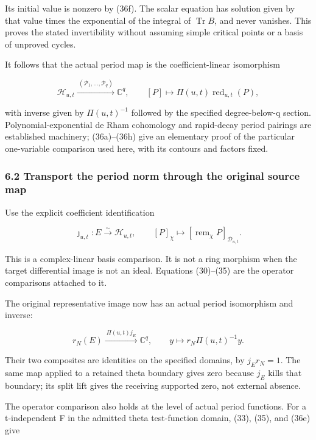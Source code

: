 \documentclass[
  11pt,
]{article}
\begin{document}
Its initial value is nonzero by (36f). The scalar equation has solution
given by that value times the exponential of the integral of
\(\operatorname{Tr}B\), and never vanishes. This proves the stated
invertibility without assuming simple critical points or a basis of
unproved cycles.

It follows that the actual period map is the coefficient-linear
isomorphism

\[
\boxed{\mathcal H_{u,t}\xrightarrow{\ (\mathcal P_1,\ldots,\mathcal P_q)\ }\mathbb C^q,
\qquad [P]\longmapsto\Pi(u,t)\operatorname{red}_{u,t}(P),}
\tag{36h}
\]

with inverse given by \(\Pi(u,t)^{-1}\) followed by the specified
degree-below-q section. Polynomial-exponential de Rham cohomology and
rapid-decay period pairings are established machinery; (36a)--(36h) give
an elementary proof of the particular one-variable comparison used here,
with its contours and factors fixed.

\subsubsection{6.2 Transport the period norm through the original source
map}\label{transport-the-period-norm-through-the-original-source-map}

Use the explicit coefficient identification

\[
\jmath_{u,t}:E\xrightarrow{\sim}\mathcal H_{u,t},
\qquad[P]_\chi\longmapsto[\operatorname{rem}_\chi P]_{\mathcal D_{u,t}}.
\tag{36i}
\]

This is a complex-linear basis comparison. It is not a ring morphism
when the target differential image is not an ideal. Equations (30)--(35)
are the operator comparisons attached to it.

The original representative image now has an actual period isomorphism
and inverse:

\[
\boxed{r_N(E)\xrightarrow{\ \Pi(u,t)j_E\ }\mathbb C^q,
\qquad y\longmapsto r_N\Pi(u,t)^{-1}y.}
\tag{36j}
\]

Their two composites are identities on the specified domains, by
\(j_Er_N=1\). The same map applied to a retained theta boundary gives
zero because \(j_E\) kills that boundary; its split lift gives the
receiving supported zero, not external absence.

The operator comparison also holds at the level of actual period
functions. For a t-independent F in the admitted theta test-function
domain, (33), (35), and (36e) give
\end{document}
